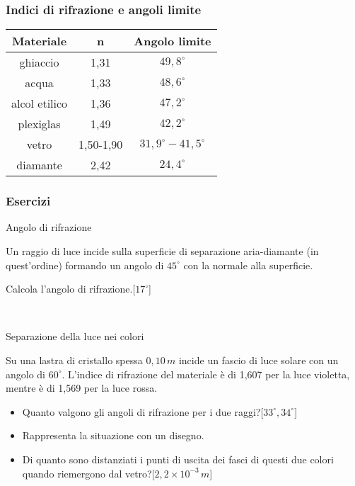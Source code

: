 \documentclass[]{beamer}
\theoremstyle{plain}
\begin{document}
\begin{frame}
\frametitle{Indici di rifrazione e angoli limite}
\begin{table}[htp]\centering
  \begin{tabular}{ccc}\hline\rule{0pt}{3ex}
        \textbf{Materiale}    & \textbf{n}  & \textbf{Angolo limite}\\\hline\rule{0pt}{3ex}
        ghiaccio      & 1,31      & $ 49,8^\circ $\\\hline\rule{0pt}{3ex}
        acqua         & 1,33      & $ 48,6^\circ $\\\hline\rule{0pt}{3ex}
        alcol etilico & 1,36      & $ 47,2^\circ $ \\\hline\rule{0pt}{3ex}
        plexiglas     & 1,49      & $ 42,2^\circ $\\\hline\rule{0pt}{3ex}
        vetro         & 1,50-1,90 & $ 31,9^\circ-41,5^\circ $\\\hline\rule{0pt}{3ex}
        diamante      & 2,42      & $ 24,4^\circ $\\\hline
  \end{tabular}
\end{table}
\end{frame}


\begin{frame}
\frametitle{Esercizi}
\begin{exampleblock}{Angolo di rifrazione}
{\small Un raggio di luce incide sulla superficie di separazione aria-diamante (in quest'ordine) formando un angolo di $ 45^\circ $ con la normale alla superficie.

Calcola l'angolo di rifrazione.\hspace*{\fill}[$ 17^\circ $]}
\end{exampleblock}

~

\begin{exampleblock}{Separazione della luce nei colori}
{\small Su una lastra di cristallo spessa $ 0,10 \, m $ incide un fascio di luce solare con un angolo di $ 60^\circ $. L'indice di rifrazione del materiale è di 1,607 per la luce violetta, mentre è di 1,569 per la luce rossa.

\begin{itemize}
  \item Quanto valgono gli angoli di rifrazione per i due raggi?\hspace*{\fill}[$ 33^\circ, 34^\circ $]
  \item Rappresenta la situazione con un disegno.
  \item Di quanto sono distanziati i punti di uscita dei fasci di questi due colori quando riemergono dal vetro?\hspace*{\fill}[$ 2,2 \times 10^{-3} \, m $]
\end{itemize}
}
\end{exampleblock}
\end{frame}
\end{document}
